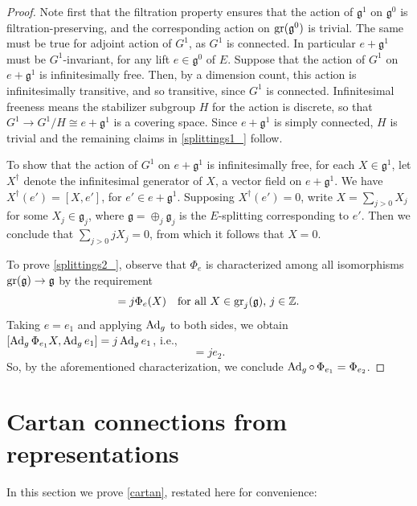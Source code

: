 \documentclass[leqno,12pt]{amsart} %
\newcommand\refreshpage{\newpage}
\newcommand\refreshpage{}
\begin{document}
\begin{proof}
  Note first that the filtration property ensures that the action of ${\mathfrak g}^1$ on
  ${\mathfrak g}^0 $ is filtration-preserving, and the corresponding action on
  $\operatorname{\operatorname{gr}}({\mathfrak g}^0)$ is trivial. The same must be true for adjoint action of
  $G^1$, as $G^1$ is connected. In particular $e + {\mathfrak g}^1$ must be
  $G^1$-invariant, for any lift $e \in {\mathfrak g}^0$ of $E$. Suppose that the action of
  $G^1$ on $e + {\mathfrak g}^1$ is infinitesimally free. Then, by a dimension count, this
  action is infinitesimally transitive, and so transitive, since $G^1$ is
  connected. Infinitesimal freeness means the stabilizer subgroup $H$ for the action is
  discrete, so that $G^1 \rightarrow G^1/H \cong e + {\mathfrak g}^1$ is a covering
  space. Since $e + {\mathfrak g}^1$ is simply connected, $H$ is trivial and the remaining
  claims in \eqref{splittings1_} follow.

  To show that the action of $G^1$ on $e + {\mathfrak g}^1$ is infinitesimally free, for
  each $X \in {\mathfrak g}^1$, let $X^\dagger$ denote the infinitesimal generator of $X$,
  a vector field on $e + {\mathfrak g}^1$. We have $X^\dagger(e') = [X, e']$, for
  $e' \in e + {\mathfrak g}^1$. Supposing $X^\dagger(e') = 0$, write $X=\sum_{j>0} X_j$
  for some $X_j \in {\mathfrak g}_j$, where ${\mathfrak g}=\oplus_j {\mathfrak g}_j$ is
  the $E$-splitting corresponding to $e'$. Then we conclude that $\sum_{j>0}jX_j=0$, from
  which it follows that $X=0$.

  To prove \eqref{splittings2_}, observe that $\Phi_e$ is characterized among all
  isomorphisms $\operatorname{\operatorname{gr}}({\mathfrak g}) \rightarrow {\mathfrak g}$ by the requirement
  \begin{equation*}
    [\Phi_e(X), e] = j \Phi_e(X)\quad
    \text{for all $X \in \graded_j({\mathfrak g}),\, j \in {\mathbb Z}$}.
  \end{equation*}
  Taking $e = e_1$ and applying $\operatorname{Ad}_g$ to both sides, we obtain
  $[\operatorname{Ad}_g \Phi_{e_1}X, \operatorname{Ad}_g e_1] = j\operatorname{Ad}_g e_1$, i.e.,
  \begin{equation*}
    [(\Adjoint_g \circ\, \Phi_{e_1})X, e_2] = je_2.
  \end{equation*}
  So, by the aforementioned characterization, we conclude
  $\operatorname{Ad}_g\circ\,\Phi_{e_1} = \Phi_{e_2}$.
\end{proof}

\refreshpage
\section{Cartan connections from representations}%
\label{rut}
In this section we prove \ref{cartan}, restated here for convenience:
\end{document}
